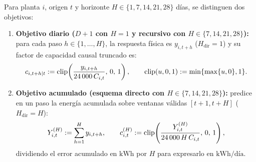 Para planta $i$, origen $t$ y horizonte $H \in \{1,7,14,21,28\}$ días, se distinguen dos objetivos:
\begin{enumerate}
    \item \textbf{Objetivo diario ($D+1$ con $H=1$ y recursivo con $H \in \{7,14,21,28\}$):} para cada paso $h \in \{1,\dots,H\}$, la respuesta física es $y_{i,t+h}$ ($H_{\mathrm{dir}} = 1$) y su factor de capacidad causal truncado es:
    \begin{equation}
    c_{i,t+h \mid t} := \operatorname{clip}\!\left(\frac{y_{i,t+h}}{24\,000\,C_{i,t}},\, 0,\, 1\right),
    \qquad \operatorname{clip}(u,0,1) := \min\{\max\{u,0\},1\}.
    \label{eq:cf_diario}
    \end{equation}
    \item \textbf{Objetivo acumulado (esquema directo con $H \in \{7,14,21,28\}$):} predice en un paso la energía acumulada sobre ventanas válidas $[t+1, t+H]$ ($H_{\mathrm{dir}} = H$):
    \begin{equation}
    Y_{i,t}^{(H)} := \sum_{h=1}^{H} y_{i,t+h},
    \qquad
    c_{i,t}^{(H)} := \operatorname{clip}\!\left(\frac{Y_{i,t}^{(H)}}{24\,000\,H\,C_{i,t}},\, 0,\, 1\right),
    \label{eq:y_directo}
    \end{equation}
    dividiendo el error acumulado en $\text{kWh}$ por $H$ para expresarlo en $\text{kWh/día}$.
\end{enumerate}

